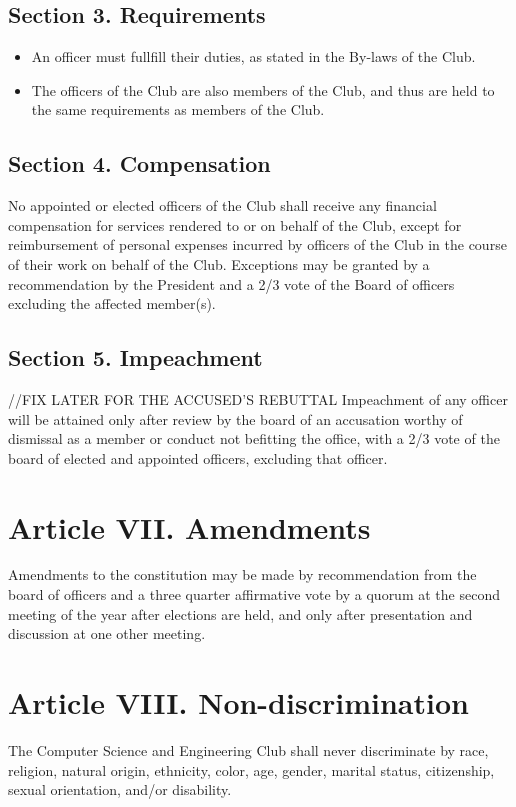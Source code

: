 \documentclass{article}
\begin{document}
  \subsection{Section 3. Requirements}
    \begin{itemize}
      \item An officer must fullfill their duties, as stated in the By-laws of the Club.
      \item The officers of the Club are also members of the Club, and thus are held to the same requirements as members of the Club.
    \end{itemize}

  \subsection{Section 4. Compensation}
    No appointed or elected officers of the Club shall receive any financial compensation for services rendered to or on behalf of the Club, except for reimbursement of personal expenses incurred by officers of the Club in the course of their work on behalf of the Club. Exceptions may be granted by a recommendation by the President and a 2/3 vote of the Board of officers excluding the affected member(s).

  \subsection{Section 5. Impeachment}//FIX LATER FOR THE ACCUSED'S REBUTTAL
    Impeachment of any officer will be attained only after review by the board of an accusation worthy of dismissal as a member or conduct not befitting the office, with a 2/3 vote of the board of elected and appointed officers, excluding that officer.

\section{Article VII. Amendments}
  Amendments to the constitution may be made by recommendation from the board of officers and a three quarter affirmative vote by a quorum at the second meeting of the year after elections are held, and only after presentation and discussion at one other meeting.

\section{Article VIII. Non-discrimination}
  The Computer Science and Engineering Club shall never discriminate by race, religion, natural origin, ethnicity, color, age, gender, marital status, citizenship, sexual orientation, and/or disability.
\end{document}
